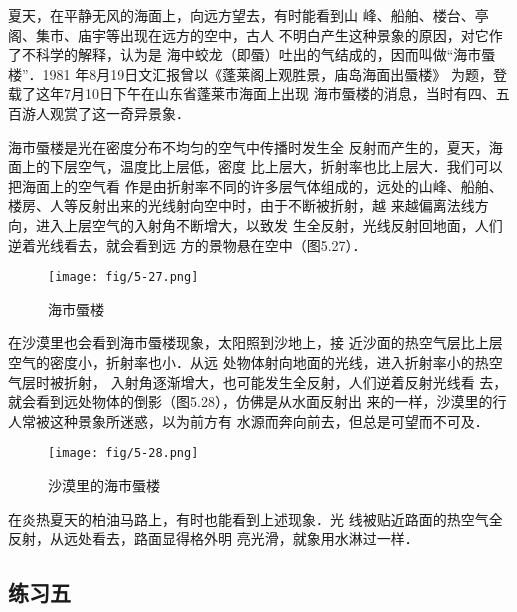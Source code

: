 夏天，在平静无风的海面上，向远方望去，有时能看到山
峰、船舶、楼台、亭阁、集市、庙宇等出现在远方的空中，古人
不明白产生这种景象的原因，对它作了不科学的解释，认为是
海中蛟龙（即蜃）吐出的气结成的，因而叫做“海市蜃楼”．1981
年8月19日文汇报曾以《蓬莱阁上观胜景，庙岛海面出蜃楼》
为题，登载了这年7月10日下午在山东省蓬莱市海面上出现
海市蜃楼的消息，当时有四、五百游人观赏了这一奇异景象．

海市蜃楼是光在密度分布不均匀的空气中传播时发生全
反射而产生的，夏天，海面上的下层空气，温度比上层低，密度
比上层大，折射率也比上层大．我们可以把海面上的空气看
作是由折射率不同的许多层气体组成的，远处的山峰、船舶、
楼房、人等反射出来的光线射向空中时，由于不断被折射，越
来越偏离法线方向，进入上层空气的入射角不断增大，以致发
生全反射，光线反射回地面，人们逆着光线看去，就会看到远
方的景物悬在空中（图5.27）．
\begin{figure}[htp]\centering
    \texttt{[image: fig/5-27.png]}
    \caption{海市蜃楼}
    \end{figure}

在沙漠里也会看到海市蜃楼现象，太阳照到沙地上，接
近沙面的热空气层比上层空气的密度小，折射率也小．从远
处物体射向地面的光线，进入折射率小的热空气层时被折射，
入射角逐渐增大，也可能发生全反射，人们逆着反射光线看
去，就会看到远处物体的倒影（图5.28），仿佛是从水面反射出
来的一样，沙漠里的行人常被这种景象所迷惑，以为前方有
水源而奔向前去，但总是可望而不可及．
\begin{figure}[htp]\centering
    \texttt{[image: fig/5-28.png]}
    \caption{沙漠里的海市蜃楼}
    \end{figure}

在炎热夏天的柏油马路上，有时也能看到上述现象．光
线被贴近路面的热空气全反射，从远处看去，路面显得格外明
亮光滑，就象用水淋过一样．

\subsection*{练习五}

